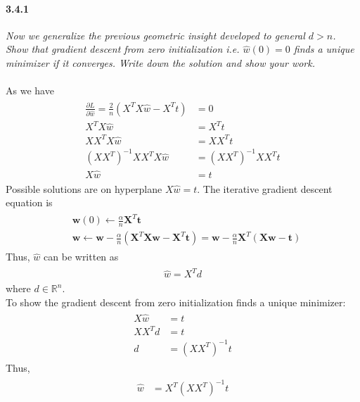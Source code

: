 \documentclass{myhw}
\begin{document}
\begin{homeworkProblem}
\begin{homeworkSection}
\paragraph{3.4.1} \emph{Now we generalize the previous geometric insight developed to general $d > n$. Show that gradient descent from zero initialization i.e. $\hat{w}(0) = 0$ finds a unique minimizer if it converges. Write down the solution and show your work.} 
\\
\\
As we have
\begin{gather*}
\begin{aligned}
\frac{\partial L}{\partial \hat{w}} = \frac{2}{n} (X^TX\hat{w} - X^Tt) &= 0 \\
X^TX\hat{w} &= X^Tt \\
XX^TX\hat{w} &= XX^Tt \\
(XX^T)^{-1}XX^TX\hat{w} &= (XX^T)^{-1}XX^Tt \\
X\hat{w} &= t
\end{aligned}
\end{gather*}
Possible solutions are on hyperplane $X\hat{w} = t$. 
The iterative gradient descent equation is 
\begin{gather*}
\begin{aligned}
&\textbf{w}(0) \leftarrow \frac{\alpha}{n} \textbf{X}^T\textbf{t} \\
&\textbf{w} \leftarrow \textbf{w} - \frac{\alpha}{n} (\textbf{X}^T\textbf{X}\textbf{w} - \textbf{X}^T\textbf{t}) = \textbf{w} - \frac{\alpha}{n} \textbf{X}^T(\textbf{X}\textbf{w} - \textbf{t}) 
\end{aligned}
\end{gather*}
Thus, $\hat{w}$ can be written as 
\begin{gather*}
\begin{aligned}
\hat{w}=X^Td
\end{aligned}
\end{gather*}
where $d \in \mathbb{R}^n$. \\
To show the gradient descent from zero initialization finds a unique minimizer: 
\begin{gather*}
\begin{aligned}
X\hat{w} &= t \\
X X^T d &= t \\
d &= (XX^T)^{-1} t
\end{aligned}
\end{gather*}
Thus, 
\begin{gather*}
\begin{aligned}
\hat{w} &= X^T (XX^T)^{-1} t
\end{aligned}
\end{gather*}

\end{homeworkSection}
\end{homeworkProblem}
\end{document}
